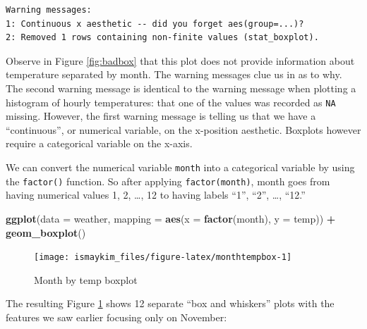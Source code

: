 \documentclass[12pt, krantz2,]{krantz}
\makeatletter
\newenvironment{Shaded}{\begin{snugshade}}{\end{snugshade}}
\newcommand{\DataTypeTok}[1]{\textcolor[rgb]{0.27,0.27,0.27}{#1}}
\newcommand{\KeywordTok}[1]{\textcolor[rgb]{0.27,0.27,0.27}{\textbf{#1}}}
\newcommand{\NormalTok}[1]{#1}
\newcommand{\OperatorTok}[1]{\textcolor[rgb]{0.43,0.43,0.43}{\textbf{#1}}}
\newcommand{\StringTok}[1]{\textcolor[rgb]{0.5,0.5,0.5}{#1}}
\newenvironment{kframe}{%
\medskip{}
\setlength{\fboxsep}{.8em}
 \def\at@end@of@kframe{}%
 \ifinner\ifhmode%
  \def\at@end@of@kframe{\end{minipage}}%
  \begin{minipage}{\columnwidth}%
 \fi\fi%
 \def\FrameCommand##1{\hskip\@totalleftmargin \hskip-\fboxsep
 \colorbox{shadecolor}{##1}\hskip-\fboxsep
     \hskip-\linewidth \hskip-\@totalleftmargin \hskip\columnwidth}%
 \MakeFramed {\advance\hsize-\width
   \@totalleftmargin\z@ \linewidth\hsize
   \@setminipage}}%
 {\par\unskip\endMakeFramed%
 \at@end@of@kframe}
\renewenvironment{Shaded}{\begin{kframe}}{\end{kframe}}
\makeatother
\begin{document}
\begin{verbatim}
Warning messages:
1: Continuous x aesthetic -- did you forget aes(group=...)? 
2: Removed 1 rows containing non-finite values (stat_boxplot). 
\end{verbatim}

Observe in Figure \ref{fig:badbox} that this plot does not provide information about temperature separated by month. The warning messages clue us in as to why. The second warning message is identical to the warning message when plotting a histogram of hourly temperatures: that one of the values was recorded as \texttt{NA} missing. However, the first warning message is telling us that we have a ``continuous'', or numerical variable, on the x-position aesthetic. Boxplots however require a categorical variable on the x-axis.

We can convert the numerical variable \texttt{month} into a categorical variable by using the \texttt{factor()} function. So after applying \texttt{factor(month)}, month goes from having numerical values 1, 2, \ldots{}, 12 to having labels ``1'', ``2'', \ldots{}, ``12.''

\begin{Shaded}
\begin{Highlighting}[]
\KeywordTok{ggplot}\NormalTok{(}\DataTypeTok{data =}\NormalTok{ weather, }\DataTypeTok{mapping =} \KeywordTok{aes}\NormalTok{(}\DataTypeTok{x =} \KeywordTok{factor}\NormalTok{(month), }\DataTypeTok{y =}\NormalTok{ temp)) }\OperatorTok{+}
\StringTok{  }\KeywordTok{geom_boxplot}\NormalTok{()}
\end{Highlighting}
\end{Shaded}

\begin{figure}

{\centering \texttt{[image: ismaykim\_files/figure-latex/monthtempbox-1]} 

}

\caption{Month by temp boxplot}\label{fig:monthtempbox}
\end{figure}

The resulting Figure \ref{fig:monthtempbox} shows 12 separate ``box and whiskers'' plots with the features we saw earlier focusing only on November:
\end{document}
